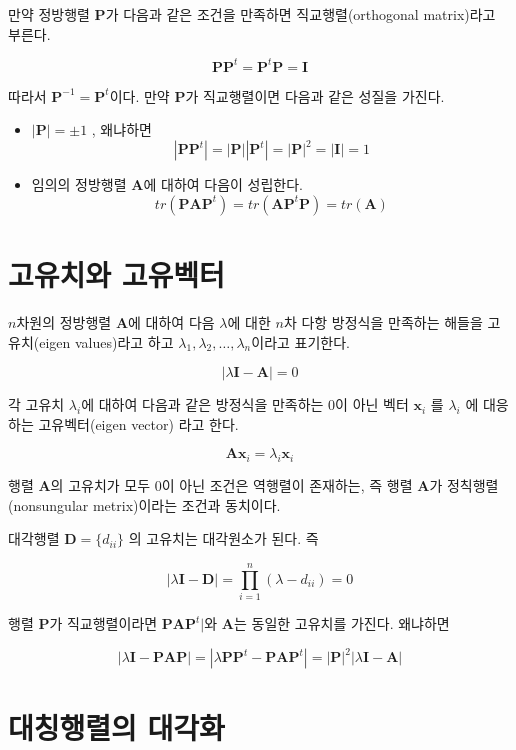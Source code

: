 \documentclass[
  10pt,
]{book}
\theoremstyle{definition}
\theoremstyle{definition}
\theoremstyle{definition}
\theoremstyle{definition}
\theoremstyle{remark}
\begin{document}
만약 정방행렬 \(\bm P\)가 다음과 같은 조건을 만족하면 직교행렬(orthogonal matrix)라고 부른다.

\[  \bm P \bm P^t = \bm P^t \bm P = \bm I \]

따라서 \(\bm P^{-1} = \bm P^t\)이다. 만약 \(\bm P\)가 직교행렬이면 다음과 같은 성질을 가진다.

\begin{itemize}
\item
  \(| \bm P | = \pm 1\) , 왜냐하면
  \[  | \bm P \bm P^t | = | \bm P | |\bm P^t |  = | \bm P|^2 = |\bm I| =1 \]
\item
  임의의 정방행렬 \(\bm A\)에 대하여 다음이 성립한다.
  \[ tr(\bm P \bm A \bm P^t) = tr(\bm A \bm P^t \bm P) = tr(\bm A) \]
\end{itemize}

\hypertarget{uxace0uxc720uxce58uxc640-uxace0uxc720uxbca1uxd130}{%
\section{고유치와 고유벡터}\label{uxace0uxc720uxce58uxc640-uxace0uxc720uxbca1uxd130}}

\(n\)차원의 정방행렬 \(\bm A\)에 대하여 다음 \(\lambda\)에 대한 \(n\)차 다항 방정식을 만족하는 해들을 고유치(eigen values)라고 하고 \(\lambda_1, \lambda_2, \dots , \lambda_n\)이라고 표기한다.

\[ | \lambda \bm I - \bm A | = 0 \]

각 고유치 \(\lambda_i\)에 대하여 다음과 같은 방정식을 만족하는 0이 아닌 벡터 \(\bm x_i\) 를 \(\lambda_i\) 에 대응하는 고유벡터(eigen vector) 라고 한다.

\[ \bm A \bm x_i = \lambda_i \bm x_i \]

행렬 \(\bm A\)의 고유치가 모두 0이 아닌 조건은 역행렬이 존재하는, 즉 행렬 \(\bm A\)가 정칙행렬(nonsungular metrix)이라는 조건과 동치이다.

대각행렬 \(\bm D = \{ d_{ii} \}\) 의 고유치는 대각원소가 된다. 즉

\[ | \lambda \bm I - \bm D | = \prod_{i=1}^n (\lambda - d_{ii}) =0 \]

행렬 \(\bm P\)가 직교행렬이라면 \(\bm P \bm A \bm P^t|\)와 \(\bm A\)는 동일한 고유치를 가진다. 왜냐하면

\[ | \lambda \bm I - \bm P \bm A \bm P | = |\lambda \bm P \bm P^t - \bm P \bm A \bm P^t| = |\bm P|^2 | \lambda \bm I - \bm A | \]

\hypertarget{uxb300uxce6duxd589uxb82cuxc758-uxb300uxac01uxd654}{%
\section{대칭행렬의 대각화}\label{uxb300uxce6duxd589uxb82cuxc758-uxb300uxac01uxd654}}
\end{document}
